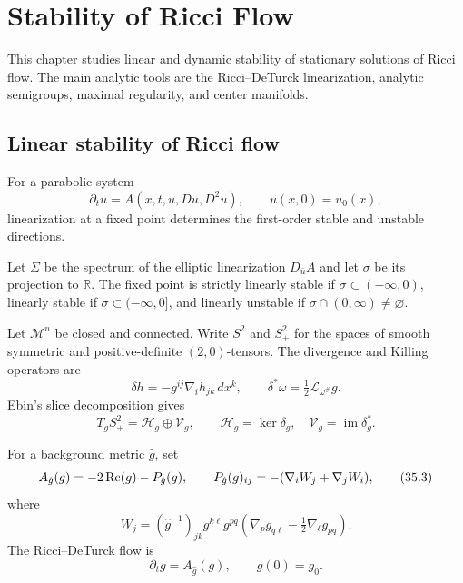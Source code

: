 \chapter{Stability of Ricci Flow}
\label{ch:chow-iv-stability-ricci-flow}

This chapter studies linear and dynamic stability of stationary solutions of
Ricci flow.  The main analytic tools are the Ricci--DeTurck linearization,
analytic semigroups, maximal regularity, and center manifolds.

\section{Linear stability of Ricci flow}

For a parabolic system
\begin{equation*}
 \partial_tu=A(x,t,u,Du,D^2u),\qquad u(x,0)=u_0(x),
 \tag{35.1}
\end{equation*}
linearization at a fixed point determines the first-order stable and unstable
directions.

\begin{definition}
\label{def:chow-iv-linear-stability}
Let $\Sigma$ be the spectrum of the elliptic linearization
$D_{\bar u}A$ and let $\sigma$ be its projection to $\mathbb R$.  The fixed
point is strictly linearly stable if $\sigma\subset(-\infty,0)$, linearly
stable if $\sigma\subset(-\infty,0]$, and linearly unstable if
$\sigma\cap(0,\infty)\ne\varnothing$.
\end{definition}

Let $\mathcal M^n$ be closed and connected.  Write $S^2$ and $S^2_+$ for the
spaces of smooth symmetric and positive-definite $(2,0)$-tensors.  The
divergence and Killing operators are
\[
 \delta h=-g^{ij}\nabla_i h_{jk}\,dx^k,
 \qquad \delta^*\omega=\tfrac12\mathcal L_{\omega^\#}g.
\]
Ebin's slice decomposition gives
\begin{equation*}
 T_gS^2_+=\mathcal H_g\oplus\mathcal V_g,
 \qquad \mathcal H_g=\ker\delta_g,\quad
 \mathcal V_g=\operatorname{im}\delta_g^*.
 \tag{35.2}
\end{equation*}

For a background metric $\hat g$, set
\begin{equation*}
 A_{\hat g}(g)=-2\operatorname{Rc}(g)-P_{\hat g}(g),
 \qquad P_{\hat g}(g)_{ij}=-(\nabla_iW_j+\nabla_jW_i),
 \tag{35.3}
\end{equation*}
where
\[
 W_j=(\hat g^{-1})_{jk}g^{k\ell}g^{pq}
 \left(\nabla_pg_{q\ell}-\tfrac12\nabla_\ell g_{pq}\right).
\]
The Ricci--DeTurck flow is
\begin{equation*}
 \partial_tg=A_{\hat g}(g),\qquad g(0)=g_0.
 \tag{35.5}
\end{equation*}

